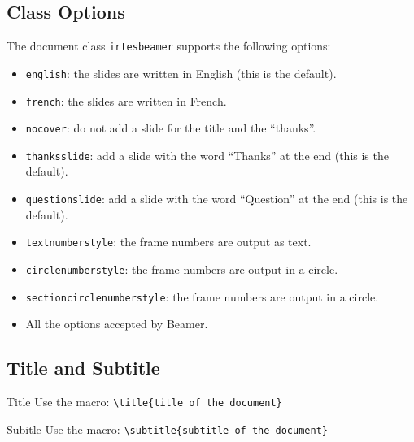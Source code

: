 \documentclass[english,circlenumberstyle]{irtesbeamer}
\begin{document}
\subsection{Class Options}
\begin{frame}{\subsecname}\smaller
	The document class \texttt{irtesbeamer} supports the following options:
	\begin{itemize}
	\item \texttt{english}: the slides are written in English (this is the default).
	\item \texttt{french}: the slides are written in French.
	\item \texttt{nocover}: do not add a slide for the title and the ``thanks''.
	\item \texttt{thanksslide}: add a slide with the word ``Thanks'' at the end (this is the default). 
	\item \texttt{questionslide}: add a slide with the word ``Question'' at the end (this is the default). 
	\item \texttt{textnumberstyle}: the frame numbers are output as text.\hfill\hyperlink{progressbartypes}{}
	\item \texttt{circlenumberstyle}: the frame numbers are output in a circle.\hfill\hyperlink{progressbartypes}{}
	\item \texttt{sectioncirclenumberstyle}: the frame numbers are output in a circle.\hfill\hyperlink{progressbartypes}{}
	\item All the options accepted by Beamer.
 	\end{itemize}
\end{frame}

\subsection{Title and Subtitle}
\begin{frame}{\subsecname}
	\begin{block}{Title}
		Use the macro: \texttt{{\textbackslash}title\{title of the document\}}
	\end{block}
	\begin{block}{Subitle}
		Use the macro: \texttt{{\textbackslash}subtitle\{subtitle of the document\}}
	\end{block}
\end{frame}
\end{document}
